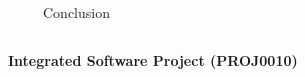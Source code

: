 \documentclass{beamer}
\begin{document}
\begin{columns}[t]
~~ 
\begin{alertblock}{Conclusion}

\end{alertblock}

~
\end{columns}

\begin{figure}
\end{figure}

\vfill{}

\begin{center}
    \textbf{Integrated Software Project (PROJ0010)}
\end{center}
\vspace{1cm}
\end{document}

